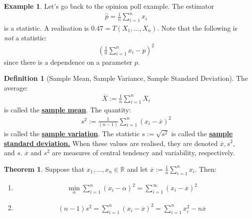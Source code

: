 \documentclass[11pt]{scrartcl}
\newcommand{\R}[0]{\mathbb{R}}
\theoremstyle{definition}
\newtheorem{theorem}{Theorem}
\newtheorem{definition}{Definition}
\newtheorem{ex}{Example}
\theoremstyle{remark}
\newcommand{\dfn}[1]{\textbf{\underline{#1}}}
\newcommand{\stat}[0]{T(X_1, ..., X_n )}
\newcommand{\smean}[0]{\frac{1}{n} \sum_{i=1}^n x_i}
\newcommand{\svar}[0]{\frac{1}{(n-1)} \sum_{i=1}^n (x_i - \overline{x})^2}
\begin{document}
{\begin{ex} Let's go back to the opinion poll example. The estimator 
\begin{align*}
\hat{p} = \frac{1}{n} \sum_{i=1}^n x_i	
\end{align*}
	is a statistic. A realisation is $0.47 = \stat$. Note that the following is \emph{not} a statistic: 
	\begin{align}
		\left( \frac{1}{n} \sum_{i=1}^n x_i - p \right)^2
	\end{align}
	since there is a dependence on a parameter $p$. 
\end{ex}

\begin{definition}[Sample Mean, Sample Variance, Sample Standard Deviation] The average: 
\begin{align}
	\overline{X} := \frac{1}{n} \sum_{i=1}^n X_i 
\end{align}
is called the \dfn{sample mean}. The quantity: 
\begin{align}
	s^2 := \svar 
\end{align}
is called the \dfn{sample variation}. The statistic $s := \sqrt{s^2}$ is called the \dfn{sample standard deviation.} When these values are realised, they are denoted $\overline{x}, s^2,$ and $s$. $\overline{x}$ and $s^2$ are measures of central tendency and variability, respectively. 

\begin{theorem}
	Suppose that $x_1, ..., x_n \in \R$ and let $\overline{x} := \smean$. Then: 
	\begin{enumerate}[noitemsep]
		\item 
		\begin{align}
			\min_\alpha \sum_{i=1}^n (x_i - \alpha)^2 = \sum_{i=1}^\infty (x_i - \overline{x})^2 
		\end{align}
		\item 
		\begin{align}
			(n-1)s^2 = \sum_{i=1}^n (x_i - \overline{x})^2 = \sum_{i=1}^n x_i^2 - n \overline{x} 
		\end{align}
	\end{enumerate}
\end{theorem}
\end{definition}

}
\end{document}
